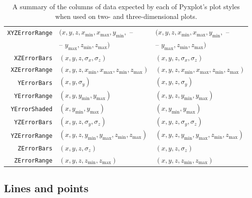 \begin{table}
\begin{tabular}{|rll|}
{\tt XYZErrorRange} & $(x,y,z,x_\mathrm{min},x_\mathrm{max},y_\mathrm{min},$ -- & $(x,y,z,x_\mathrm{min},x_\mathrm{max},y_\mathrm{min},$ -- \\
                    & -- $y_\mathrm{max},z_\mathrm{min},z_\mathrm{max})$ & -- $y_\mathrm{max},z_\mathrm{min},z_\mathrm{max})$ \\
{\tt XZErrorBars} & $(x,y,z,\sigma_x,\sigma_z)$ & $(x,y,z,\sigma_x,\sigma_z)$ \\
{\tt XZErrorRange} & $(x,y,z,x_\mathrm{min},x_\mathrm{max},z_\mathrm{min},z_\mathrm{max})$ & $(x,y,z,x_\mathrm{min},x_\mathrm{max},z_\mathrm{min},z_\mathrm{max})$ \\
{\tt YErrorBars} & $(x,y,\sigma_y)$ & $(x,y,z,\sigma_y)$ \\
{\tt YErrorRange} & $(x,y,y_\mathrm{min},y_\mathrm{max})$ & $(x,y,z,y_\mathrm{min},y_\mathrm{max})$ \\
{\tt YErrorShaded} & $(x,y_\mathrm{min},y_\mathrm{max})$ & $(x,y_\mathrm{min},y_\mathrm{max})$ \\
{\tt YZErrorBars} & $(x,y,z,\sigma_y,\sigma_z)$ & $(x,y,z,\sigma_y,\sigma_z)$ \\
{\tt YZErrorRange} & $(x,y,z,y_\mathrm{min},y_\mathrm{max},z_\mathrm{min},z_\mathrm{max})$ & $(x,y,z,y_\mathrm{min},y_\mathrm{max},z_\mathrm{min},z_\mathrm{max})$ \\
{\tt ZErrorBars} & $(x,y,z,\sigma_z)$ & $(x,y,z,\sigma_z)$ \\
{\tt ZErrorRange} & $(x,y,z,z_\mathrm{min},z_\mathrm{max})$ & $(x,y,z,z_\mathrm{min},z_\mathrm{max})$ \\
\hline
\end{tabular}
\caption{A summary of the columns of data expected by each of Pyxplot's plot styles when used on two- and three-dimensional plots.}
\label{tab:plot_style_columns}
\end{table}

\subsection{Lines and points}

